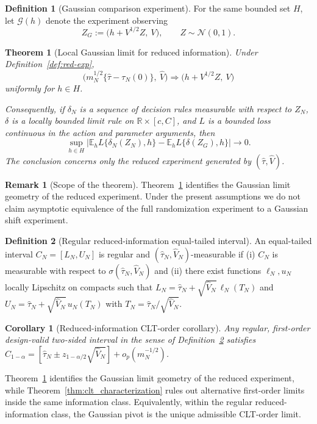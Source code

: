 \documentclass[aos]{imsart}
\newtheorem{theorem}{Theorem}
\newtheorem{corollary}{Corollary}
\theoremstyle{definition}
\newtheorem{definition}{Definition}
\newtheorem{remark}{Remark}
\theoremstyle{plain}
\newcommand{\E}{\mathbb{E}}
\newcommand{\mN}{m_N}
\newcommand{\R}{\mathbb{R}}
\newcommand{\tauN}{\hat{\tau}_N}
\newcommand{\VN}{\hat V_N}
\begin{document}
\begin{definition}[Gaussian comparison experiment]\label{def:gauss-exp}
For the same bounded set $H$, let $\mathcal G(h)$ denote the experiment observing
\[
Z_G:=\bigl(h+V^{1/2}Z,\ V\bigr),\qquad Z\sim\mathcal N(0,1).
\]
\end{definition}

\begin{theorem}[Local Gaussian limit for reduced information]\label{thm:sufficiency}
Under Definition~\ref{def:red-exp},
\[
\Big(m_N^{1/2}\{\hat\tau-\tau_N(0)\},\ \hat V\Big)
\Rightarrow
\bigl(h+V^{1/2}Z,\ V\bigr)
\]
uniformly for $h\in H$.

Consequently, if $\delta_N$ is a sequence of decision rules measurable with respect to $Z_N$, $\delta$ is a locally bounded limit rule on $\R\times[c,C]$, and $L$ is a bounded loss continuous in the action and parameter arguments, then
\[
\sup_{h\in H}\left|
\E_h L\{\delta_N(Z_N),h\}
-
\E_h L\{\delta(Z_G),h\}
\right|\to 0.
\]
The conclusion concerns only the reduced experiment generated by $(\hat\tau,\hat V)$.
\end{theorem}

\begin{remark}[Scope of the theorem]
Theorem~\ref{thm:sufficiency} identifies the Gaussian limit geometry of the reduced experiment. Under the present assumptions we do not claim asymptotic equivalence of the full randomization experiment to a Gaussian shift experiment.
\end{remark}

\begin{definition}[Regular reduced-information equal-tailed interval]\label{def:regular_pivot}
An equal-tailed interval $C_N=[L_N,U_N]$ is regular and $(\tauN,\VN)$-measurable if
(i) $C_N$ is measurable with respect to $\sigma(\tauN,\VN)$ and
(ii) there exist functions $\ell_N,u_N$ locally Lipschitz on compacts such that
$L_N=\tauN+\sqrt{\VN}\,\ell_N(T_N)$ and $U_N=\tauN+\sqrt{\VN}\,u_N(T_N)$
with $T_N=\tauN/\sqrt{\VN}$.
\end{definition}

\begin{corollary}[Reduced-information CLT-order corollary]\label{cor:char}
Any regular, first-order design-valid two-sided interval in the sense of Definition~\ref{def:regular_pivot} satisfies
$C_{1-\alpha}=[\tauN\pm z_{1-\alpha/2}\sqrt{\VN}]+o_p(\mN^{-1/2})$.
\end{corollary}
Theorem~\ref{thm:sufficiency} identifies the Gaussian limit geometry of the reduced experiment, while
Theorem~\ref{thm:clt_characterization} rules out alternative first-order limits inside the same information class.
Equivalently, within the regular reduced-information class, the Gaussian pivot is the unique admissible CLT-order limit.
\end{document}
